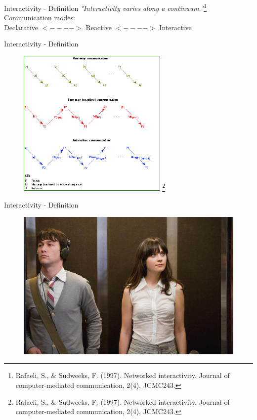 \documentclass{beamer}
\newcommand\blfootnote[1]{%
  \begingroup
  \renewcommand\thefootnote{}\footnote{#1}%
  \addtocounter{footnote}{-1}%
  \endgroup
}
\begin{document}
\begin{frame}{Interactivity - Definition} 
    \textit{"Interactivity varies along a continuum."}\footnote{Rafaeli, S., \& Sudweeks, F. (1997). Networked interactivity. Journal of computer-mediated communication, 2(4), JCMC243.}\\
    \vspace{5mm}
    Communication modes: \\
    Declarative $<---->$ Reactive  $<---->$ Interactive
\end{frame}

\begin{frame}{Interactivity - Definition} 
    \begin{figure}[h]
        \includegraphics[width=0.65\textwidth]{interactivity_model.png} \blfootnote{Rafaeli, S., \& Sudweeks, F. (1997). Networked interactivity. Journal of computer-mediated communication, 2(4), JCMC243.}
    \end{figure}
\end{frame}

\begin{frame}{Interactivity - Definition} 
    \begin{figure}[h]
        \includegraphics[width=\textwidth]{ascensor.jpg}
    \end{figure}
\end{frame}
\end{document}
